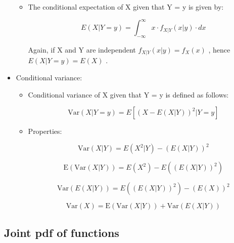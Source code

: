 \documentclass[12pt]{report}
\renewcommand{\_}{\kern-1.5pt\textunderscore\kern-1.5pt}
\begin{document}
\begin{itemize}
\begin{itemize}
	\item The conditional expectation of X given that Y = y is given by:\par

 \[ E \left( X \vert Y=y \right) = \int _{-\infty}^{\infty}x \cdot f_{X \vert Y} \left( x \vert y \right)  \cdot dx \] \par

Again, if X and Y are independent  \( f_{X \vert Y} \left( x \vert y \right) =f_{X} \left( x \right)  \) , hence  \( E \left( X \vert Y=y \right) =E \left( X \right)  \) .\par


\end{itemize}
	\item Conditional variance:\par

\begin{itemize}
	\item Conditional variance of X given that Y = y is defined as follows:\par

 \[ \mathrm{Var} \left( X \vert Y=y \right) =E \left[  \left( X-E \left( X \vert Y \right)  \right) ^{2} \vert Y=y \right]  \] \par

	\item Properties:\par

 \[ \mathrm{Var} \left( X \vert Y \right) =E \left( X^{2} \vert Y \right) - \left( E \left( X \vert Y \right)  \right) ^{2} \] \par

 \[ \mathrm{E} \left( \mathrm{Var} \left( X \vert Y \right)  \right) =E \left( X^{2} \right) -E \left(  \left( E \left( X \vert Y \right)  \right) ^{2} \right)  \] \par

 \[ \mathrm{Var} \left( E \left( X \vert Y \right)  \right) =E \left(  \left( E \left( X \vert Y \right)  \right) ^{2} \right) - \left( E \left( X \right)  \right) ^{2} \] \par

 \[ \mathrm{Var} \left( X \right) =\mathrm{E} \left( \mathrm{Var} \left( X \vert Y \right)  \right) +\mathrm{Var} \left( E \left( X \vert Y \right)  \right)  \] \par


\end{itemize}
\end{itemize}\subsection*{Joint pdf of functions}
\end{document}
